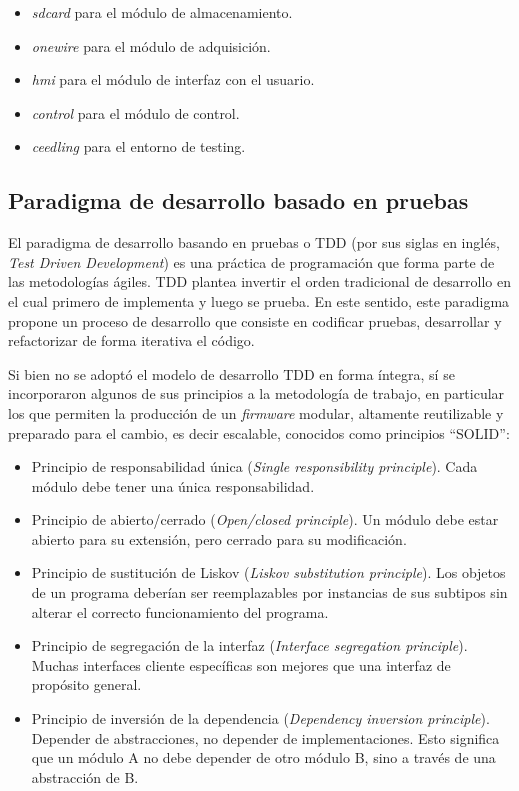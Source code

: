 \begin{itemize}
	\item \textit{sdcard} para el módulo de almacenamiento.
	\item \textit{onewire} para el módulo de adquisición.
	\item \textit{hmi} para el módulo de interfaz con el usuario.
	\item \textit{control} para el módulo de control.
	\item \textit{ceedling} para el entorno de testing.
\end{itemize}  

\subsection{Paradigma de desarrollo basado en pruebas}
\label{subsec:tdd}

El paradigma de desarrollo basando en pruebas o TDD (por sus siglas en inglés, \textit{Test Driven Development}) \citep{beck2003test} es una práctica de programación que forma parte de las metodologías ágiles.  TDD plantea invertir el orden tradicional de desarrollo en el cual primero de implementa y luego se prueba.  En este sentido, este paradigma propone un proceso de desarrollo que consiste en codificar pruebas, desarrollar y refactorizar de forma iterativa el código.

Si bien no se adoptó el modelo de desarrollo TDD en forma íntegra, sí se incorporaron algunos de sus principios a la metodología de trabajo, en particular los que permiten la producción de un \textit{firmware} modular, altamente reutilizable y preparado para el cambio, es decir escalable, conocidos como principios ``SOLID''\citep{martin2000design}:

\begin{itemize}
	\item Principio de responsabilidad única (\textit{Single responsibility principle}). Cada módulo debe tener una única responsabilidad.
	\item Principio de abierto/cerrado (\textit{Open/closed principle}). Un módulo debe estar abierto para su extensión, pero cerrado para su modificación.
	\item Principio de sustitución de Liskov (\textit{Liskov substitution principle}). Los objetos de un programa deberían ser reemplazables por instancias de sus subtipos sin alterar el correcto funcionamiento del programa.
	\item Principio de segregación de la interfaz (\textit{Interface segregation principle}). Muchas interfaces cliente específicas son mejores que una interfaz de propósito general.
	\item Principio de inversión de la dependencia (\textit{Dependency inversion principle}). Depender de abstracciones, no depender de implementaciones.  Esto significa que un módulo A no debe depender de otro módulo B, sino a través de una abstracción de B.
\end{itemize}

